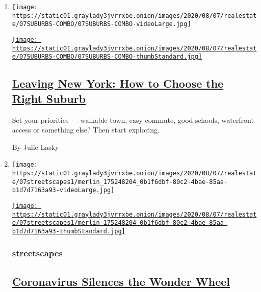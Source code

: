 \begin{enumerate}
\def\labelenumi{\arabic{enumi}.}
\item
  \texttt{[image: https://static01.graylady3jvrrxbe.onion/images/2020/08/07/realestate/07SUBURBS-COMBO/07SUBURBS-COMBO-videoLarge.jpg]}

  \href{/2020/08/07/realestate/coronavirus-escape-suburbs-new-york.html}{\texttt{[image: https://static01.graylady3jvrrxbe.onion/images/2020/08/07/realestate/07SUBURBS-COMBO/07SUBURBS-COMBO-thumbStandard.jpg]}}

  \hypertarget{leaving-new-york-how-to-choose-the-right-suburb}{%
  \subsection{\texorpdfstring{\href{/2020/08/07/realestate/coronavirus-escape-suburbs-new-york.html}{Leaving
  New York: How to Choose the Right
  Suburb}}{Leaving New York: How to Choose the Right Suburb}}\label{leaving-new-york-how-to-choose-the-right-suburb}}

  Set your priorities --- walkable town, easy commute, good schools,
  waterfront access or something else? Then start exploring.

  By Julie Lasky
\item
  \texttt{[image: https://static01.graylady3jvrrxbe.onion/images/2020/08/07/realestate/07streetscapes1/merlin\_175248204\_0b1f6dbf-80c2-4bae-85aa-b1d7d7163a93-videoLarge.jpg]}

  \href{/2020/08/07/realestate/coronavirus-coney-island-wonder-wheel.html}{\texttt{[image: https://static01.graylady3jvrrxbe.onion/images/2020/08/07/realestate/07streetscapes1/merlin\_175248204\_0b1f6dbf-80c2-4bae-85aa-b1d7d7163a93-thumbStandard.jpg]}}

  \hypertarget{streetscapes}{%
  \subsubsection{streetscapes}\label{streetscapes}}

  \hypertarget{coronavirus-silences-the-wonder-wheel}{%
  \subsection{\texorpdfstring{\href{/2020/08/07/realestate/coronavirus-coney-island-wonder-wheel.html}{Coronavirus
  Silences the Wonder
  Wheel}}{Coronavirus Silences the Wonder Wheel}}\label{coronavirus-silences-the-wonder-wheel}}


\end{enumerate}
